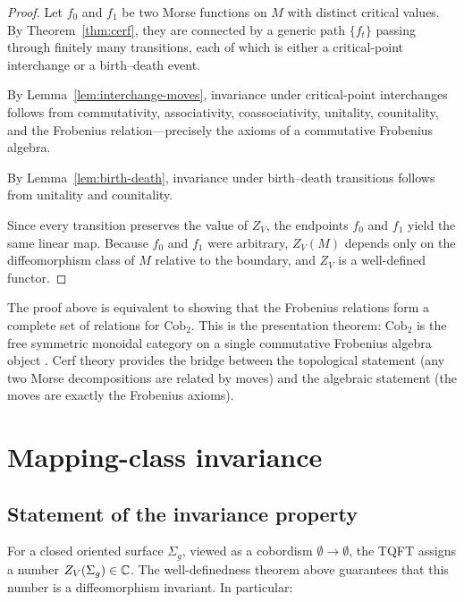 \begin{proof}
Let $f_0$ and $f_1$ be two Morse functions on $M$ with distinct critical values. By Theorem~\ref{thm:cerf}, they are connected by a generic path $\{f_t\}$ passing through finitely many transitions, each of which is either a critical-point interchange or a birth--death event.

By Lemma~\ref{lem:interchange-moves}, invariance under critical-point interchanges follows from commutativity, associativity, coassociativity, unitality, counitality, and the Frobenius relation---precisely the axioms of a commutative Frobenius algebra.

By Lemma~\ref{lem:birth-death}, invariance under birth--death transitions follows from unitality and counitality.

Since every transition preserves the value of $Z_V$, the endpoints $f_0$ and $f_1$ yield the same linear map. Because $f_0$ and $f_1$ were arbitrary, $Z_V(M)$ depends only on the diffeomorphism class of $M$ relative to the boundary, and $Z_V$ is a well-defined functor.
\end{proof}

\begin{remark}\label{rem:generators-relations}
The proof above is equivalent to showing that the Frobenius relations form a complete set of relations for $\mathrm{Cob}_2$. This is the presentation theorem: $\mathrm{Cob}_2$ is the free symmetric monoidal category on a single commutative Frobenius algebra object \cite[Theorem~3.6.19]{Kock2004Frobenius}. Cerf theory provides the bridge between the topological statement (any two Morse decompositions are related by moves) and the algebraic statement (the moves are exactly the Frobenius axioms).
\end{remark}


\section{Mapping-class invariance}\label{appsec:mapping-class}

\subsection{Statement of the invariance property}

For a closed oriented surface $\Sigma_g$, viewed as a cobordism $\emptyset \to \emptyset$, the TQFT assigns a number $Z_V(\Sigma_g) \in \mathbb{C}$. The well-definedness theorem above guarantees that this number is a diffeomorphism invariant. In particular:

